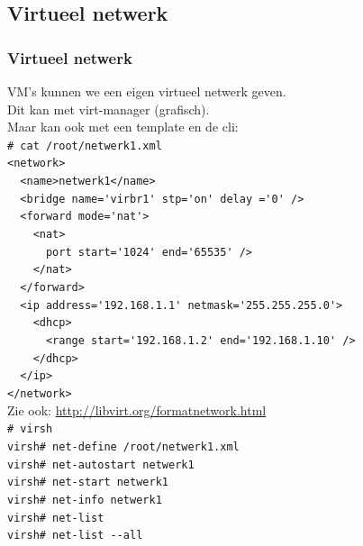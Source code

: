 \subsection {Virtueel netwerk}
\begin{styleframefrag}
    \frametitle{Virtueel netwerk}
VM's kunnen we een eigen virtueel netwerk geven.\\
\pause
Dit kan met virt-manager (grafisch).\\
\pause
Maar kan ook met een template en de cli:\\
\pause
\scriptsize
\verb!# cat /root/netwerk1.xml!\\
\tiny
\verb!<network>!\\
\verb!  <name>netwerk1</name>!\\
\verb!  <bridge name='virbr1' stp='on' delay ='0' />!\\
\verb!  <forward mode='nat'>!\\
\verb!    <nat>!\\
\verb!      port start='1024' end='65535' />!\\
\verb!    </nat>!\\
\verb!  </forward>!\\
\verb!  <ip address='192.168.1.1' netmask='255.255.255.0'>!\\
\verb!    <dhcp>!\\
\verb!      <range start='192.168.1.2' end='192.168.1.10' />!\\
\verb!    </dhcp>!\\
\verb!  </ip>!\\
\verb!</network>!\\
\scriptsize
Zie ook: \url{http://libvirt.org/formatnetwork.html}\\
\pause
\verb!# virsh!\\
\pause
\verb!virsh# net-define /root/netwerk1.xml!\\
\pause
\verb!virsh# net-autostart netwerk1!\\
\pause
\verb!virsh# net-start netwerk1!\\
\pause
\verb!virsh# net-info netwerk1!\\
\pause
\verb!virsh# net-list!\\
\pause
\verb!virsh# net-list --all!\\
\end{styleframefrag}

